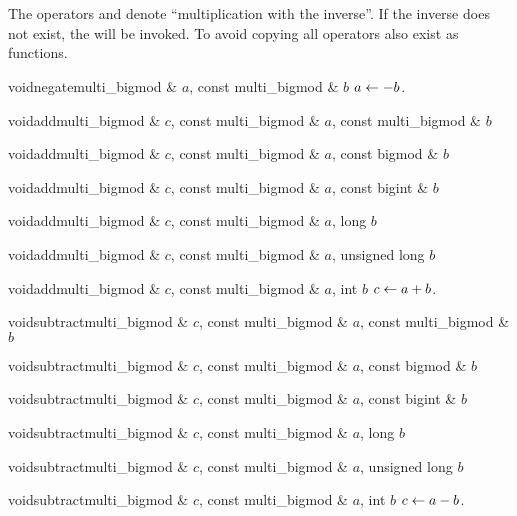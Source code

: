 \begin{center}
  \\
  \\
\end{center}

The operators \code{/} and \code{/=} denote ``multiplication with the inverse''.  If the inverse
does not exist, the \LEH will be invoked.  To avoid copying all operators also exist as
functions.

\begin{fcode}{void}{negate}{multi_bigmod & $a$, const multi_bigmod & $b$}
  $a \leftarrow -b$.
\end{fcode}

\begin{fcode}{void}{add}{multi_bigmod & $c$, const multi_bigmod & $a$, const multi_bigmod & $b$}\end{fcode}
\begin{fcode}{void}{add}{multi_bigmod & $c$, const multi_bigmod & $a$, const bigmod & $b$}\end{fcode}
\begin{fcode}{void}{add}{multi_bigmod & $c$, const multi_bigmod & $a$, const bigint & $b$}\end{fcode}
\begin{fcode}{void}{add}{multi_bigmod & $c$, const multi_bigmod & $a$, long $b$}\end{fcode}
\begin{fcode}{void}{add}{multi_bigmod & $c$, const multi_bigmod & $a$, unsigned long $b$}\end{fcode}
\begin{fcode}{void}{add}{multi_bigmod & $c$, const multi_bigmod & $a$, int $b$}
  $c \leftarrow a + b$.
\end{fcode}

\begin{fcode}{void}{subtract}{multi_bigmod & $c$, const multi_bigmod & $a$, const multi_bigmod & $b$}\end{fcode}
\begin{fcode}{void}{subtract}{multi_bigmod & $c$, const multi_bigmod & $a$, const bigmod & $b$}\end{fcode}
\begin{fcode}{void}{subtract}{multi_bigmod & $c$, const multi_bigmod & $a$, const bigint & $b$}\end{fcode}
\begin{fcode}{void}{subtract}{multi_bigmod & $c$, const multi_bigmod & $a$, long $b$}\end{fcode}
\begin{fcode}{void}{subtract}{multi_bigmod & $c$, const multi_bigmod & $a$, unsigned long $b$}\end{fcode}
\begin{fcode}{void}{subtract}{multi_bigmod & $c$, const multi_bigmod & $a$, int $b$}
  $c \leftarrow a - b$.
\end{fcode}

